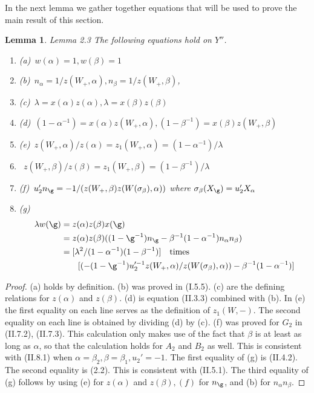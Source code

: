 \documentclass{memo-l}
\newtheorem{lemma}[theorem]{Lemma}
\theoremstyle{definition}
\theoremstyle{remark}
\numberwithin{section}{chapter}
\numberwithin{equation}{chapter}
\begin{document}
{\medskip}

In the next lemma we gather together equations that will be used to prove 
the main result of this section.

\begin{lemma}{Lemma 2.3}   The following equations hold on $Y''$.
\begin{enumerate}
\item{(a)}\   $w({\alpha}) = 1, w({\beta}) = 1$
\item{(b)}\   $n_{\alpha} = 1/z(W_{+},{\alpha}), n_{\beta} = 
1/z(W_{+},{\beta})$,
\item{(c)}\   ${\lambda} = x({\alpha})z({\alpha}), {\lambda} = 
x({\beta})z({\beta})$
\item{(d)}\   $(1-{\alpha}^{-1}) = x({\alpha})z(W_{+},{\alpha}), 
(1-{\beta}^{-1}) = x({\beta})z(W_{+},{\beta})$
\item{(e)}\   $z(W_{+},{\alpha})/z({\alpha}) = z_{1}(W_{+},{\alpha}) = 
(1-{\alpha}^{-1})/{\lambda}$
\item{{\phantom{(e)}}}\   $z(W_{+},{\beta})/z({\beta}) = z_{1}(W_{+},{\beta}) = 
(1-{\beta}^{-1})/{\lambda}$
\item{(f)}\   $u_{2}'n_{{\g}} = -1/(z(W_{+},{\beta})z(W({\sigma}_{\beta}), 
{\alpha}))$ where ${\sigma}_{\beta}(X_{{\g}}) = u_{2}'X_{\alpha}$
\item{(g)}\   $$\aligned
{\lambda}w({\g}) &= z({\alpha})z({\beta})x({\g}) \\
&= 
z({\alpha})z({\beta})((1-{\g}^{-1})n_{{\g}} - {\beta}^{-1}
(1-{\alpha}^{-1})n_{\alpha}n_{\beta})  
\\ &=
[{\lambda}^{2}/(1-{\alpha}^{-1})(1-{\beta}^{-1})] \quad
\hbox{times}\\
&\quad\quad [(-(1-{\g}^{-1})
u_{2}^{\prime-1}z(W_+,{\alpha})/z(W({\sigma}_{\beta}),{\alpha})) - 
{\beta}^{-1}(1-{\alpha}^{-1})]\endaligned$$
\end{enumerate}
\end{lemma} 

\medpagebreak

\begin{proof}    (a) holds by definition.  (b) was proved in (I.5.5). 
(c) are the defining relations for $z({\alpha})$ and $z({\beta})$. 
(d) is equation (II.3.3) combined with (b). 
In (e) the first equality on each line serves as the definition of 
$z_{1}(W,-)$. 
 The second equality on each line is obtained by dividing (d) by (c). 
(f) was proved for $G_{2}$ in (II.7.2), (II.7.3). 
 This calculation only makes use of the fact that ${\beta}$ is at least as 
long as ${\alpha}$,
so that the calculation holds for $A_{2}$ and $B_{2}$ as well. 
 This is consistent with (II.8.1) when ${\alpha} = {\beta}_{2}, 
{\beta}={\beta}_{1}, u_{2}'=-1$. 
 The first equality of (g) is (II.4.2). 
 The second equality is (2.2). 
 This is consistent with (II.5.1). 
 The third equality of (g) follows by using (e) for $z({\alpha})$ and 
$z({\beta}), (f)$ for $n_{{\g}}$, and (b) for $n_{\alpha}n_{\beta}$.
\end{proof}
\end{document}
